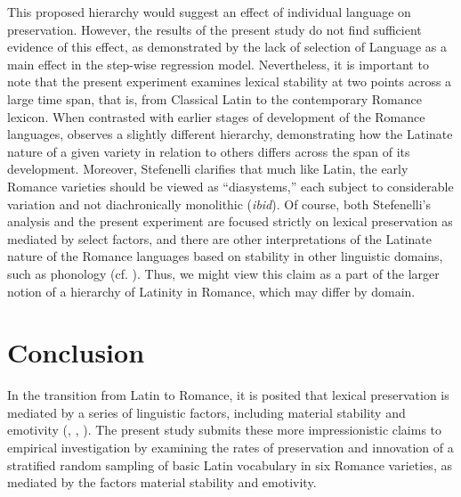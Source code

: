 \documentclass[output=paper,colorlinks,citecolor=brown,
]{langscibook}
\begin{document}
This proposed hierarchy would suggest an effect of individual language on preservation. However, the results of the present study do not find sufficient evidence of this effect, as demonstrated by the lack of selection of Language as a main effect in the step-wise regression model. Nevertheless, it is important to note that the present experiment examines lexical stability at two points across a large time span, that is, from Classical Latin to the contemporary Romance lexicon. When contrasted with earlier stages of development of the Romance languages, \citet[583]{stefenelli_lexical_2011} observes a slightly different hierarchy, demonstrating how the Latinate nature of a given variety in relation to others differs across the span of its development. Moreover, Stefenelli clarifies that much like Latin, the early Romance varieties should be viewed as “diasystems,” each subject to considerable variation and not diachronically monolithic (\textit{ibid}). Of course, both Stefenelli’s analysis and the present experiment are focused strictly on lexical preservation as mediated by select factors, and there are other interpretations of the Latinate nature of the Romance languages based on stability in other linguistic domains, such as phonology (cf. \citealt[326--327]{posner_romance_1996}). Thus, we might view this claim as a part of the larger notion of a hierarchy of Latinity in Romance, which may differ by domain.

\section*{Conclusion}
In the transition from Latin to Romance, it is posited that lexical preservation is mediated by a series of linguistic factors, including material stability and emotivity (\citealt{posner_romance_1996}, \citealt{glessgen_linguistique_2007}, \citealt{stefenelli_lexical_2011}). The present study submits these more impressionistic claims to empirical investigation by examining the rates of preservation and innovation of a stratified random sampling of basic Latin vocabulary in six Romance varieties, as mediated by the factors material stability and emotivity.
\end{document}
